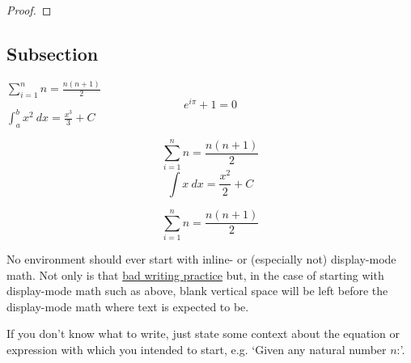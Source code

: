 \begin{proof}
    \lipsum[1]
\end{proof}

\begin{coro}
    \lipsum[][1-4]
\end{coro}

\subsection{Subsection}

\lipsum[][1-9]

\begin{defn}
    \lipsum[][1] \(\sum_{i=1}^{n} n = \frac{n(n+1)}{2}\) \lipsum[][2-3]
    \[e^{i\pi}+1 = 0\]
    \lipsum[][4] \(\int_{a}^{b} x^2 \ dx = \frac{x^3}{3} + C\) \lipsum[][5-6]
\end{defn}

\begin{nota}
    \lipsum[][1-3]
    \[\sum_{i=1}^{n} n = \frac{n(n+1)}{2}\]
    \lipsum[][4-5]
    \[\int x \ dx = \frac{x^2}{2} + C\]
    \lipsum[][6-7]
\end{nota}

\begin{defn}
    \[\sum_{i=1}^{n} n = \frac{n(n+1)}{2}\]
    \lipsum[][3-5]
\end{defn}

\begin{rmrk}
    No environment should ever start with inline- or (especially not) display-mode math. Not only is that \href{https://kconrad.math.uconn.edu/blurbs/proofs/writingtips.pdf}{bad writing practice} but, in the case of starting with display-mode math such as above, blank vertical space will be left before the display-mode math where text is expected to be.

    If you don't know what to write, just state some context about the equation or expression with which you intended to start, e.g. `Given any natural number \(n\):'.
\end{rmrk}

